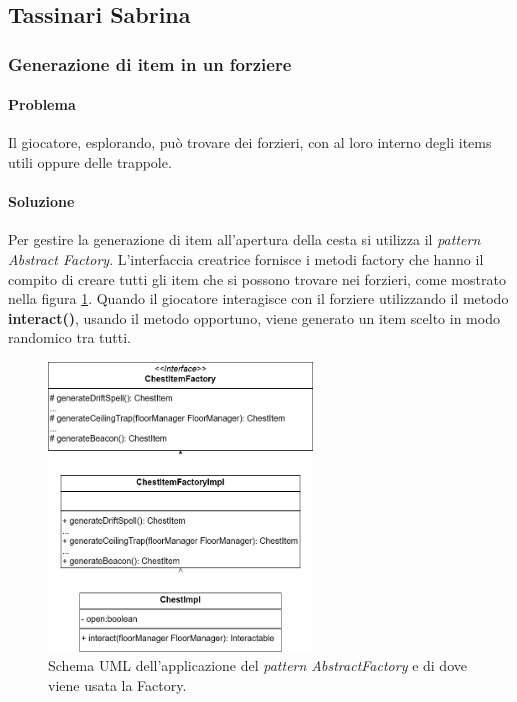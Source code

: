 \documentclass{report}
\begin{document}
\clearpage
\subsection{Tassinari Sabrina}

\subsubsection{Generazione di item in un forziere}

\paragraph{Problema} Il giocatore, esplorando, può trovare dei forzieri, con al loro interno degli items utili oppure delle trappole. 

\paragraph{Soluzione} Per gestire la generazione di item all'apertura della cesta si utilizza il \textit{pattern Abstract Factory}.
%
L'interfaccia creatrice fornisce i metodi factory che hanno il compito di creare tutti gli item che si possono trovare nei forzieri, come mostrato nella figura \ref{img:chestItemFactory}. 
%
Quando il giocatore interagisce con il forziere utilizzando il metodo \textbf{interact()}, usando il metodo opportuno, viene generato un item scelto in modo randomico tra tutti.

\begin{figure}[H]
    \centering
    \includegraphics[width=7cm]{patternFactory.drawio.png}
    \caption{Schema UML dell'applicazione del \textit{pattern AbstractFactory} e di dove viene usata la Factory.}
    \label{img:chestItemFactory}
\end{figure}
\end{document}
